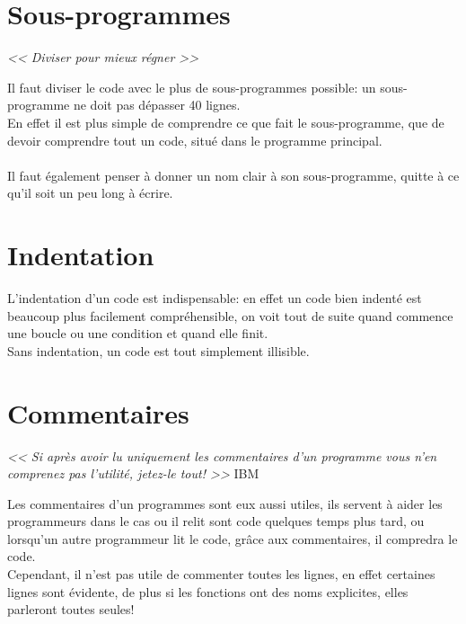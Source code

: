 \documentclass[12pt,a4paper,openany]{article}
\begin{document}
	\section{Sous-programmes}
		\begin{center}
		\large{\textit{<< Diviser pour mieux régner >>}}
		\end{center}
		Il faut diviser le code avec le plus de sous-programmes possible: un sous-programme ne doit pas
			dépasser 40 lignes. \\
		En effet il est plus simple de comprendre ce que fait le sous-programme, 
			que de devoir comprendre tout un code, situé dans le programme principal.\\ \\
		Il faut également penser à donner un nom clair à son sous-programme, quitte à ce qu'il soit
		un peu long à écrire.
	\section{Indentation}
		L'indentation d'un code est indispensable: en effet un code bien indenté est beaucoup plus facilement 
		compréhensible, on voit tout de suite quand commence une boucle ou une condition et quand elle
		finit. \\
		Sans indentation, un code est tout simplement illisible.  
	\section{Commentaires}
		\begin{center}
		\large{\textit{<< Si après avoir lu uniquement les commentaires 
			d'un programme vous n'en comprenez pas l'utilité, jetez-le tout! >>}} IBM
		\end{center}

		Les commentaires d'un programmes sont eux aussi utiles, ils servent à aider les programmeurs
		dans le cas ou il relit sont code quelques temps plus tard, ou lorsqu'un autre programmeur lit
		le code, grâce aux commentaires, il compredra le code.\\
		Cependant, il n'est pas utile de commenter toutes les lignes, en effet certaines lignes 
			sont évidente, de plus si les fonctions ont des noms explicites, elles parleront toutes seules! 
%			
			
\end{document}
